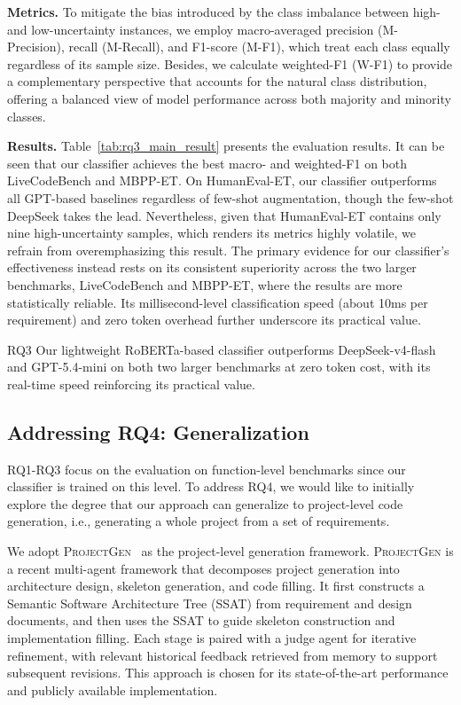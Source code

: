 \noindent \textbf{Metrics.}
To mitigate the bias introduced by the class imbalance between high- and low-uncertainty instances, we employ macro-averaged precision (M-Precision), recall (M-Recall), and F1-score (M-F1), which treat each class equally regardless of its sample size. Besides, we calculate weighted-F1 (W-F1) to provide a complementary perspective that accounts for the natural class distribution, offering a balanced view of model performance across both majority and minority classes.

\noindent \textbf{Results.}
Table~\ref{tab:rq3_main_result} presents the evaluation results. It can be seen that our classifier achieves the best macro- and weighted-F1 on both LiveCodeBench and MBPP-ET. On HumanEval-ET, our classifier outperforms all GPT-based baselines regardless of few-shot augmentation, though the few-shot DeepSeek takes the lead. Nevertheless, given that HumanEval-ET contains only nine high-uncertainty samples, which renders its metrics highly volatile, we refrain from overemphasizing this result. The primary evidence for our classifier's effectiveness instead rests on its consistent superiority across the two larger benchmarks, LiveCodeBench and MBPP-ET, where the results are more statistically reliable. Its millisecond-level classification speed (about 10ms per requirement) and zero token overhead further underscore its practical value.


\begin{rqsummary}{RQ3}
    Our lightweight RoBERTa-based classifier outperforms DeepSeek-v4-flash and GPT-5.4-mini on both two larger benchmarks at zero token cost, with its real-time speed reinforcing its practical value.
\end{rqsummary}



\subsection{Addressing RQ4: Generalization}
\label{sec:rq4}

RQ1-RQ3 focus on the evaluation on function-level benchmarks since our classifier is trained on this level. To address RQ4, we would like to initially explore the degree that our approach can generalize to project-level code generation, i.e., generating a whole project from a set of requirements. 

We adopt \textsc{ProjectGen}~\cite{zhao2025projectgen} as the project-level generation framework. \textsc{ProjectGen} is a recent multi-agent framework that decomposes project generation into architecture design, skeleton generation, and code filling. It first constructs a Semantic Software Architecture Tree (SSAT) from requirement and design documents, and then uses the SSAT to guide skeleton construction and implementation filling. Each stage is paired with a judge agent for iterative refinement, with relevant historical feedback retrieved from memory to support subsequent revisions. This approach is chosen for its state-of-the-art performance and publicly available implementation.

